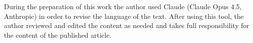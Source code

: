 During the preparation of this work the author used Claude (Claude Opus 4.5, Anthropic) in order to revise the language of the text.
After using this tool, the author reviewed and edited the content as needed and takes full responsibility for the content of the published article.
